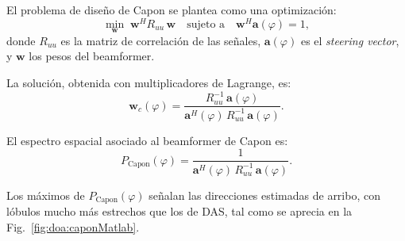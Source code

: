 El problema de diseño de Capon se plantea como una optimización:
\begin{equation}
	\min_{\mathbf{w}} \; \mathbf{w}^H R_{uu}\, \mathbf{w}
	\quad \text{sujeto a} \quad \mathbf{w}^H \mathbf{a}(\varphi) = 1,
\end{equation}
donde $R_{uu}$ es la matriz de correlación de las señales, 
$\mathbf{a}(\varphi)$ es el \emph{steering vector}, 
y $\mathbf{w}$ los pesos del beamformer.

La solución, obtenida con multiplicadores de Lagrange, es:
\begin{equation}
	\mathbf{w}_c(\varphi) = \frac{R_{uu}^{-1}\, \mathbf{a}(\varphi)}
	{\mathbf{a}^H(\varphi)\, R_{uu}^{-1}\, \mathbf{a}(\varphi)}.
\end{equation}

El espectro espacial asociado al beamformer de Capon es:
\begin{equation}
	P_{\text{Capon}}(\varphi) = 
	\frac{1}{\mathbf{a}^H(\varphi)\, R_{uu}^{-1}\, \mathbf{a}(\varphi)}.
\end{equation}

Los máximos de $P_{\text{Capon}}(\varphi)$ señalan las direcciones estimadas de arribo, 
con lóbulos mucho más estrechos que los de DAS, 
tal como se aprecia en la Fig.~\ref{fig:doa:caponMatlab}.

